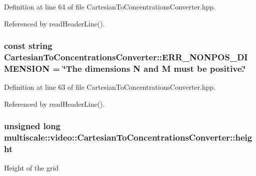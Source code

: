 \-Definition at line 64 of file \-Cartesian\-To\-Concentrations\-Converter.\-hpp.



\-Referenced by read\-Header\-Line().

\hypertarget{classmultiscale_1_1video_1_1CartesianToConcentrationsConverter_a5581717e5d7af582462abe8b38aa4650}{
\subsubsection[{\-E\-R\-R\-\_\-\-N\-O\-N\-P\-O\-S\-\_\-\-D\-I\-M\-E\-N\-S\-I\-O\-N}]{\setlength{\rightskip}{0pt plus 5cm}const string {\bf \-Cartesian\-To\-Concentrations\-Converter\-::\-E\-R\-R\-\_\-\-N\-O\-N\-P\-O\-S\-\_\-\-D\-I\-M\-E\-N\-S\-I\-O\-N} = \char`\"{}\-The dimensions \-N and \-M must be positive.\char`\"{}}}\label{classmultiscale_1_1video_1_1CartesianToConcentrationsConverter_a5581717e5d7af582462abe8b38aa4650}


\-Definition at line 63 of file \-Cartesian\-To\-Concentrations\-Converter.\-hpp.



\-Referenced by read\-Header\-Line().

\hypertarget{classmultiscale_1_1video_1_1CartesianToConcentrationsConverter_a94e58072f2e143bd6476133370ffb37f}{
\subsubsection[{height}]{\setlength{\rightskip}{0pt plus 5cm}unsigned long {\bf multiscale\-::video\-::\-Cartesian\-To\-Concentrations\-Converter\-::height}}}\label{classmultiscale_1_1video_1_1CartesianToConcentrationsConverter_a94e58072f2e143bd6476133370ffb37f}
\-Height of the grid 

